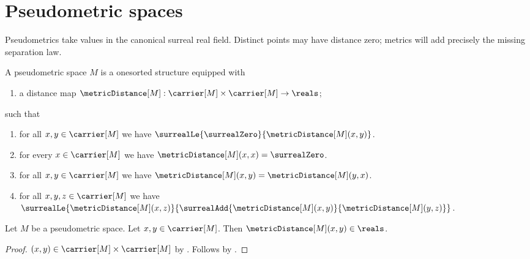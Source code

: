 \section{Pseudometric spaces}



Pseudometrics take values in the canonical surreal real field.  Distinct
points may have distance zero; metrics will add precisely the missing
separation law.

\begin{struct}\label{pseudometric_space}
    A pseudometric space $M$ is a onesorted structure equipped with
    \begin{enumerate}
        \item\label{pseudometric_distance_graph}
            a distance map
            $\metricDistance[M]:
                \carrier[M]\times\carrier[M]\to\reals$;
    \end{enumerate}
    such that
    \begin{enumerate}
        \item\label{pseudometric_distance_nonnegative}
            for all $x,y\in\carrier[M]$ we have
                $\surrealLe{\surrealZero}{\metricDistance[M](x,y)}$.
        \item\label{pseudometric_distance_self}
            for every $x\in\carrier[M]$ we have
                $\metricDistance[M](x,x)=\surrealZero$.
        \item\label{pseudometric_distance_symmetric}
            for all $x,y\in\carrier[M]$ we have
                $\metricDistance[M](x,y)=\metricDistance[M](y,x)$.
        \item\label{pseudometric_triangle}
            for all $x,y,z\in\carrier[M]$ we have
                $\surrealLe{\metricDistance[M](x,z)}
                    {\surrealAdd{\metricDistance[M](x,y)}
                        {\metricDistance[M](y,z)}}$.
    \end{enumerate}
\end{struct}

\begin{proposition}\label{pseudometric_distance_type}
    Let $M$ be a pseudometric space.
    Let $x,y\in\carrier[M]$.
    Then $\metricDistance[M](x,y)\in\reals$.
\end{proposition}
\begin{proof}
    $(x,y)\in\carrier[M]\times\carrier[M]$
        by .
    Follows by .
\end{proof}
